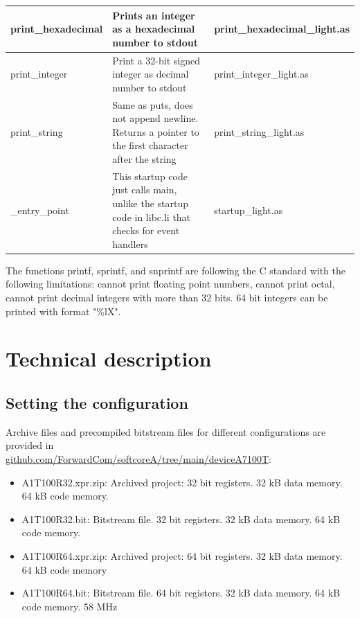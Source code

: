 \documentclass[11pt,a4paper,oneside,openright]{report}
\newcommand{\vv}{ \vspace{2mm} }   %
\begin{document}
\begin{tabular}{|p{25mm}|p{100mm}|p{30mm}|}
print\_hexadecimal  & Prints an integer as a hexadecimal number to stdout & print\_hexadecimal\_light.as \\ \hline

print\_integer & Print a 32-bit signed integer as decimal number to stdout & print\_integer\_light.as \\ \hline

print\_string  & Same as puts, does not append newline. Returns a pointer to the first character after the string & print\_string\_light.as \\ \hline

\_entry\_point & This startup code just calls main, unlike the startup code in libc.li that checks for event handlers & startup\_light.as  \\ \hline

\end{tabular}
\vv

The functions printf, sprintf, and snprintf are following the C standard with the following limitations: cannot print floating point numbers, cannot print octal, cannot print decimal integers with more than 32 bits. 64 bit integers can be printed with format "\%lX".
\vv


\chapter{Technical description}

\section{Setting the configuration} \label{SettingConfiguration}
Archive files and precompiled bitstream files for different configurations are provided in \\

\href{https://github.com/ForwardCom/softcoreA/tree/main/deviceA7100T}{github.com/ForwardCom/softcoreA/tree/main/deviceA7100T}:
\begin{itemize}
\item A1T100R32.xpr.zip: Archived project: 32 bit registers. 32 kB data memory. 64 kB code memory.
\item A1T100R32.bit: Bitstream file. 32 bit registers. 32 kB data memory. 64 kB code memory.
\item A1T100R64.xpr.zip: Archived project: 64 bit registers. 32 kB data memory. 64 kB code memory
\item A1T100R64.bit: Bitstream file. 64 bit registers. 32 kB data memory. 64 kB code memory. 58 MHz
\end{itemize}
\vv
\end{document}
